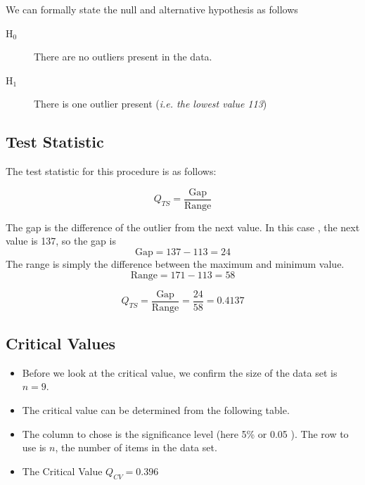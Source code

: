 \documentclass[a4paper,12pt]{article}
\begin{document}
We can formally state the null and alternative hypothesis as follows

\begin{description}
\item[H$_0$] There are no outliers present in the data.
\item[H$_1$] There is one outlier present (\textit{i.e. the lowest value 113})
\end{description}

\subsection*{Test Statistic}

The test statistic for this procedure is as follows:

\[ Q_{TS} =  \frac{\mbox{Gap}}{\mbox{Range}} \]

\noindent The gap is the difference of the outlier from the next value. In this case , the next value is 137, so the gap is 
\[ \mbox{Gap} = 137 - 113 = 24\]
The range is simply the difference between the maximum and minimum value.
\[ \mbox{Range} =  171-113 =58\]

\[ Q_{TS} =  \frac{\mbox{Gap}}{\mbox{Range}} = \frac{24}{58} = 0.4137 \]

\subsection*{Critical Values}

\begin{itemize}
    \item Before we look at the critical value, we confirm the size of the data set is $n=9$.

\item The critical value can be determined from the following table. 

\item  The column to chose is the significance level (here 5\% or 0.05 ). The row to use is $n$, the number of items in the data set.

\item The Critical Value $Q_{CV} = 0.396$
\end{itemize}
\end{document}
